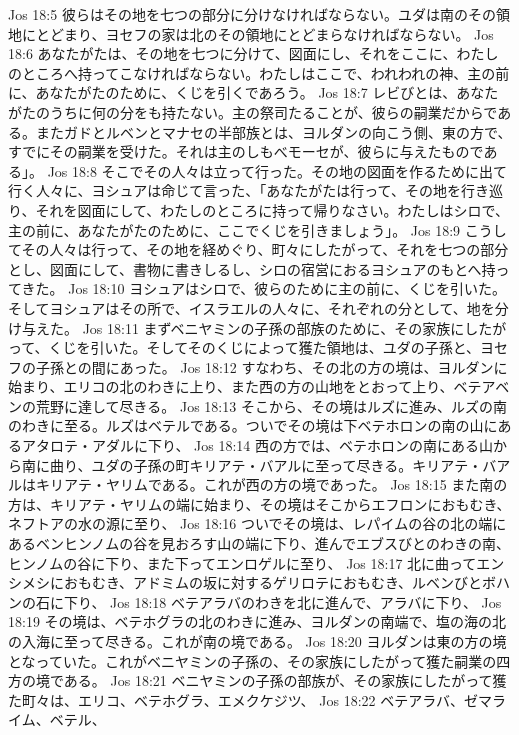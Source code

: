 Jos 18:5  彼らはその地を七つの部分に分けなければならない。ユダは南のその領地にとどまり、ヨセフの家は北のその領地にとどまらなければならない。
Jos 18:6  あなたがたは、その地を七つに分けて、図面にし、それをここに、わたしのところへ持ってこなければならない。わたしはここで、われわれの神、主の前に、あなたがたのために、くじを引くであろう。
Jos 18:7  レビびとは、あなたがたのうちに何の分をも持たない。主の祭司たることが、彼らの嗣業だからである。またガドとルベンとマナセの半部族とは、ヨルダンの向こう側、東の方で、すでにその嗣業を受けた。それは主のしもべモーセが、彼らに与えたものである」。
Jos 18:8  そこでその人々は立って行った。その地の図面を作るために出て行く人々に、ヨシュアは命じて言った、「あなたがたは行って、その地を行き巡り、それを図面にして、わたしのところに持って帰りなさい。わたしはシロで、主の前に、あなたがたのために、ここでくじを引きましょう」。
Jos 18:9  こうしてその人々は行って、その地を経めぐり、町々にしたがって、それを七つの部分とし、図面にして、書物に書きしるし、シロの宿営におるヨシュアのもとへ持ってきた。
Jos 18:10  ヨシュアはシロで、彼らのために主の前に、くじを引いた。そしてヨシュアはその所で、イスラエルの人々に、それぞれの分として、地を分け与えた。
Jos 18:11  まずベニヤミンの子孫の部族のために、その家族にしたがって、くじを引いた。そしてそのくじによって獲た領地は、ユダの子孫と、ヨセフの子孫との間にあった。
Jos 18:12  すなわち、その北の方の境は、ヨルダンに始まり、エリコの北のわきに上り、また西の方の山地をとおって上り、ベテアベンの荒野に達して尽きる。
Jos 18:13  そこから、その境はルズに進み、ルズの南のわきに至る。ルズはベテルである。ついでその境は下ベテホロンの南の山にあるアタロテ・アダルに下り、
Jos 18:14  西の方では、ベテホロンの南にある山から南に曲り、ユダの子孫の町キリアテ・バアルに至って尽きる。キリアテ・バアルはキリアテ・ヤリムである。これが西の方の境であった。
Jos 18:15  また南の方は、キリアテ・ヤリムの端に始まり、その境はそこからエフロンにおもむき、ネフトアの水の源に至り、
Jos 18:16  ついでその境は、レパイムの谷の北の端にあるベンヒンノムの谷を見おろす山の端に下り、進んでエブスびとのわきの南、ヒンノムの谷に下り、また下ってエンロゲルに至り、
Jos 18:17  北に曲ってエンシメシにおもむき、アドミムの坂に対するゲリロテにおもむき、ルベンびとボハンの石に下り、
Jos 18:18  ベテアラバのわきを北に進んで、アラバに下り、
Jos 18:19  その境は、ベテホグラの北のわきに進み、ヨルダンの南端で、塩の海の北の入海に至って尽きる。これが南の境である。
Jos 18:20  ヨルダンは東の方の境となっていた。これがベニヤミンの子孫の、その家族にしたがって獲た嗣業の四方の境である。
Jos 18:21  ベニヤミンの子孫の部族が、その家族にしたがって獲た町々は、エリコ、ベテホグラ、エメクケジツ、
Jos 18:22  ベテアラバ、ゼマライム、ベテル、
